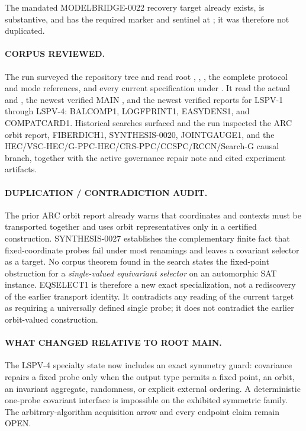 \documentclass[11pt]{article}
\begin{document}
The mandated MODELBRIDGE-0022 recovery target already exists, is substantive, and has the required marker and sentinel at
; it was therefore not duplicated.

\paragraph{CORPUS REVIEWED.}
The run surveyed the repository tree and read root , , , the complete  protocol and mode references, and every current specification under .  It read the actual  and , the newest verified MAIN
, and the newest verified reports for LSPV-1 through LSPV-4: BALCOMP1, LOGFPRINT1, EASYDENS1, and COMPATCARD1.  Historical searches surfaced and the run inspected the ARC orbit report, FIBERDICH1, SYNTHESIS-0020, JOINTGAUGE1, and the HEC/VSC-HEC/G-PPC-HEC/CRS-PPC/CCSPC/RCCN/Search-G causal branch, together with the active governance repair note and cited experiment artifacts.

\paragraph{DUPLICATION / CONTRADICTION AUDIT.}
The prior ARC orbit report already warns that coordinates and contexts must be transported together and uses orbit representatives only in a certified construction.  SYNTHESIS-0027 establishes the complementary finite fact that fixed-coordinate probes fail under most renamings and leaves a covariant selector as a target.  No corpus theorem found in the search states the fixed-point obstruction for a \emph{single-valued equivariant selector} on an automorphic SAT instance.  EQSELECT1 is therefore a new exact specialization, not a rediscovery of the earlier transport identity.  It contradicts any reading of the current target as requiring a universally defined single probe; it does not contradict the earlier orbit-valued construction.

\paragraph{WHAT CHANGED RELATIVE TO ROOT MAIN.}
The LSPV-4 specialty state now includes an exact symmetry guard: covariance repairs a fixed probe only when the output type permits a fixed point, an orbit, an invariant aggregate, randomness, or explicit external ordering.  A deterministic one-probe covariant interface is impossible on the exhibited symmetric family.  The arbitrary-algorithm acquisition arrow and every endpoint claim remain OPEN.
\end{document}
